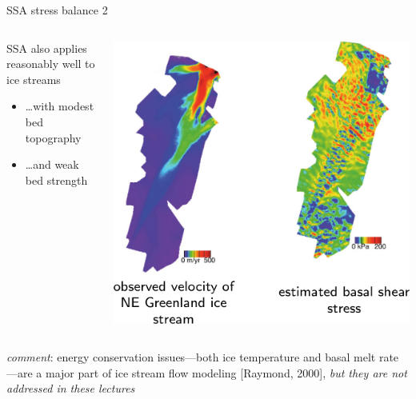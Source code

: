 \begin{frame}{SSA stress balance 2}

\begin{columns}
\begin{column}{0.55\textwidth}
SSA also applies reasonably well to ice streams
\begin{itemize}
\item \dots with modest bed topography
\item \dots and weak bed strength
\end{itemize}
\end{column}

\begin{column}{0.45\textwidth}
  \includegraphics[width=1.0\textwidth]{photos/NEgreenlandJoughin}
\end{column}
\end{columns}

\bigskip\bigskip
\small
\emph{comment}:  energy conservation issues---both ice temperature and basal melt rate---are a major part of ice stream flow modeling [Raymond, 2000], \emph{but they are not addressed in these lectures}
\end{frame}


